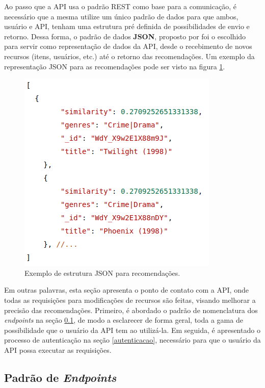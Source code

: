 \documentclass[12pt, openright, oneside, a4paper, brazil]{abntex2}
\begin{document}
Ao passo que a API usa o padrão REST como base para a comunicação, é necessário que a mesma utilize um único padrão de dados para que ambos, usuário e API, tenham uma estrutura pré definida de possibilidades de envio e retorno. Dessa forma, o padrão de dados \textbf{JSON}, proposto por  foi o escolhido para servir como representação de dados da API, desde o recebimento de novos recursos (itens, usuários, etc.) até o retorno das recomendações. Um exemplo da representação JSON para as recomendações pode ser visto na figura \ref{json_example}.

\begin{figure}[h!tp]
	\caption{\label{json_example}Exemplo de estrutura JSON para recomendações.}
	\begin{center}
		\includegraphics[scale=0.75]{images/json_example.png}
	\end{center}
	\hspace{5.5cm}{Fonte: O Autor.}
\end{figure}

Em outras palavras, esta seção apresenta o ponto de contato com a API, onde todas as requisições para modificações de recursos são feitas, visando melhorar a precisão das recomendações. Primeiro, é abordado o padrão de nomenclatura dos \textit{endpoints} na seção \ref{endpoints}, de modo a esclarecer de forma geral, toda a gama de possibilidade que o usuário da API tem ao utilizá-la. Em seguida, é apresentado o processo de autenticação na seção \ref{autenticacao}, necessário para que o usuário da API possa executar as requisições.

\subsection{Padrão de \textit{Endpoints}} \label{endpoints}
\end{document}

